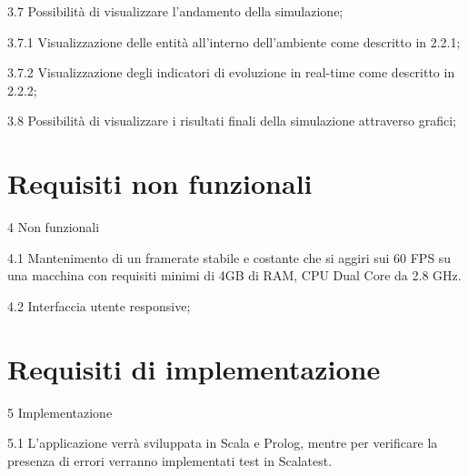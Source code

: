 \begin{myEnumerate}
\begin{myEnumerate}[label*=\arabic*.]
	\item[3.7] Possibilità di visualizzare l'andamento della simulazione;	
	\begin{myEnumerate}[label*=\arabic*.]
		\item[3.7.1] Visualizzazione delle entità all'interno dell'ambiente come descritto in 2.2.1;
		\item[3.7.2] Visualizzazione degli indicatori di evoluzione in real-time come descritto in 2.2.2;
	\end{myEnumerate}
	\item[3.8] Possibilità di visualizzare i risultati finali della simulazione attraverso grafici;
	\end{myEnumerate}
\end{myEnumerate}

\section{Requisiti non funzionali}

\begin{myEnumerate}[label*=\arabic*.]
	\item[4] Non funzionali
	\begin{myEnumerate}[label*=\arabic*.]
		\label{sec:cpu}
		\item[4.1] Mantenimento di un framerate stabile e costante che si aggiri sui 60 FPS su una macchina con requisiti minimi di 4GB di RAM, CPU Dual Core da 2.8 GHz.
		\item[4.2] Interfaccia utente responsive;
	\end{myEnumerate}
\end{myEnumerate}


\section{Requisiti di implementazione}

\begin{myEnumerate}[label*=\arabic*.]
	\item[5] Implementazione
	\begin{myEnumerate}[label*=\arabic*.]
		\item[5.1] L'applicazione verrà sviluppata in Scala e Prolog, mentre per verificare la presenza di errori verranno implementati test in Scalatest.
	\end{myEnumerate}
\end{myEnumerate}